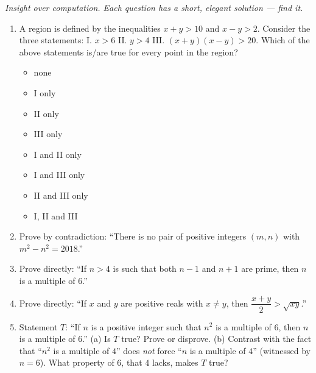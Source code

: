 \documentclass[11pt,a4paper]{article}
\begin{document}
\noindent\textit{Insight over computation. Each question has a short, elegant solution --- find it.}

\begin{enumerate}

\item A region is defined by the inequalities $x+y>10$ and $x-y>2$. Consider the three statements: I. $x>6$ II. $y>4$ III. $(x+y)(x-y)>20$. Which of the above statements is/are true for every point in the region?
\begin{itemize}
\item[A)] none
\item[B)] I only
\item[C)] II only
\item[D)] III only
\item[E)] I and II only
\item[F)] I and III only
\item[G)] II and III only
\item[H)] I, II and III
\end{itemize}

\item Prove by contradiction: ``There is no pair of positive integers $(m,n)$ with $m^2-n^2=2018$.''

\item Prove directly: ``If $n>4$ is such that both $n-1$ and $n+1$ are prime, then $n$ is a multiple of $6$.''

\item Prove directly: ``If $x$ and $y$ are positive reals with $x\neq y$, then $\dfrac{x+y}{2}>\sqrt{xy}$.''

\item Statement $T$: ``If $n$ is a positive integer such that $n^2$ is a multiple of $6$, then $n$ is a multiple of $6$.'' (a) Is $T$ true? Prove or disprove. (b) Contrast with the fact that ``$n^2$ is a multiple of $4$'' does \emph{not} force ``$n$ is a multiple of $4$'' (witnessed by $n=6$). What property of $6$, that $4$ lacks, makes $T$ true?

\end{enumerate}

\end{document}
